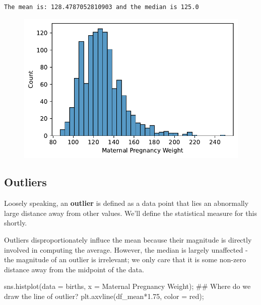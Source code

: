 \documentclass[
  letterpaper,
  DIV=11,
  numbers=noendperiod]{scrreprt}
\newenvironment{Shaded}{\begin{snugshade}}{\end{snugshade}}
\newcommand{\CommentTok}[1]{\textcolor[rgb]{0.37,0.37,0.37}{#1}}
\newcommand{\FloatTok}[1]{\textcolor[rgb]{0.68,0.00,0.00}{#1}}
\newcommand{\NormalTok}[1]{\textcolor[rgb]{0.00,0.23,0.31}{#1}}
\newcommand{\OperatorTok}[1]{\textcolor[rgb]{0.37,0.37,0.37}{#1}}
\newcommand{\StringTok}[1]{\textcolor[rgb]{0.13,0.47,0.30}{#1}}
\begin{document}
\begin{verbatim}
The mean is: 128.4787052810903 and the median is 125.0
\end{verbatim}

\begin{figure}[H]

{\centering \includegraphics{visualization_1/visualization_1_files/figure-pdf/cell-11-output-2.pdf}

}

\end{figure}

\hypertarget{outliers}{%
\subsection{Outliers}\label{outliers}}

Loosely speaking, an \textbf{outlier} is defined as a data point that
lies an abnormally large distance away from other values. We'll define
the statistical measure for this shortly.

Outliers disproportionately influce the mean because their magnitude is
directly involved in computing the average. However, the median is
largely unaffected - the magnitude of an outlier is irrelevant; we only
care that it is some non-zero distance away from the midpoint of the
data.

\begin{Shaded}
\begin{Highlighting}[]
\NormalTok{sns.histplot(data }\OperatorTok{=}\NormalTok{ births, x }\OperatorTok{=} \StringTok{\textquotesingle{}Maternal Pregnancy Weight\textquotesingle{}}\NormalTok{)}\OperatorTok{;}
\CommentTok{\#\# Where do we draw the line of outlier? }
\NormalTok{plt.axvline(df\_mean}\OperatorTok{*}\FloatTok{1.75}\NormalTok{, color }\OperatorTok{=} \StringTok{\textquotesingle{}red\textquotesingle{}}\NormalTok{)}\OperatorTok{;}
\end{Highlighting}
\end{Shaded}
\end{document}
